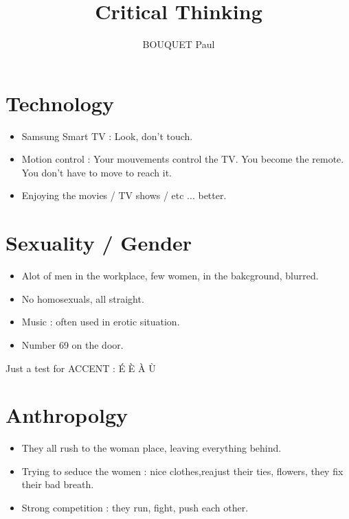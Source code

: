 \documentclass{article}
\title{Critical Thinking}
\author{BOUQUET Paul}
\date{\vspace{-5ex}}
\begin{document}
\maketitle

\section{Technology}

\begin{itemize}

\item Samsung Smart TV : Look, don't touch.

\item Motion control : Your mouvements control the TV. You become the remote.
You don't have to move to reach it.

\item Enjoying the movies / TV shows / etc ... better.

\end{itemize}

\section{Sexuality / Gender}

\begin{itemize}

\item Alot of men in the workplace, few women, in the bakcground, blurred.

\item No homosexuals, all straight.

\item Music : often used in erotic situation.

\item Number 69 on the door.

\end{itemize}

Just a test for ACCENT : É È À Ù

\section{Anthropolgy}

\begin{itemize}

\item They all rush to the woman place, leaving everything behind.

\item Trying to seduce the women : nice clothes,reajust their ties, flowers, they fix their bad breath.

\item Strong competition : they run, fight, push each other.

\end{itemize}
\end{document}
